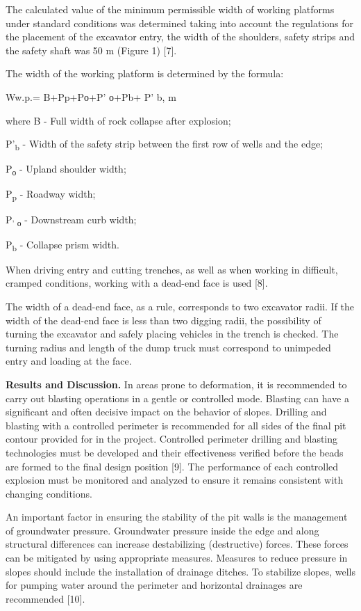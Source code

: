 \begin{multicols}{2}
The calculated value of the minimum permissible width of working
platforms under standard conditions was determined taking into account
the regulations for the placement of the excavator entry, the width of
the shoulders, safety strips and the safety shaft was 50 m (Figure 1)
{[}7{]}.

The width of the working platform is determined by the formula:

Ww.p.= B+Pp+Pо+P' о+Pb+ P' b, m

where B - Full width of rock collapse after explosion;

P'{}\textsubscript{b} - Width of the safety strip between
the first row of wells and the edge;

P\textsubscript{о} - Upland shoulder width;

P\textsubscript{p} - Roadway width;

P\textsubscript{' о} - Downstream curb width;

P\textsubscript{b} - Collapse prism width.

When driving entry and cutting trenches, as well as when working in
difficult, cramped conditions, working with a dead-end face is used
{[}8{]}.

The width of a dead-end face, as a rule, corresponds to two excavator
radii. If the width of the dead-end face is less than two digging radii,
the possibility of turning the excavator and safely placing vehicles in
the trench is checked. The turning radius and length of the dump truck
must correspond to unimpeded entry and loading at the face.

{\bfseries Results and Discussion.} In areas prone to deformation, it is
recommended to carry out blasting operations in a gentle or controlled
mode. Blasting can have a significant and often decisive impact on the
behavior of slopes. Drilling and blasting with a controlled perimeter is
recommended for all sides of the final pit contour provided for in the
project. Controlled perimeter drilling and blasting technologies must be
developed and their effectiveness verified before the beads are formed
to the final design position {[}9{]}. The performance of each controlled
explosion must be monitored and analyzed to ensure it remains consistent
with changing conditions.

An important factor in ensuring the stability of the pit walls is the
management of groundwater pressure. Groundwater pressure inside the edge
and along structural differences can increase destabilizing
(destructive) forces. These forces can be mitigated by using appropriate
measures. Measures to reduce pressure in slopes should include the
installation of drainage ditches. To stabilize slopes, wells for pumping
water around the perimeter and horizontal drainages are recommended
{[}10{]}.


\end{multicols}
